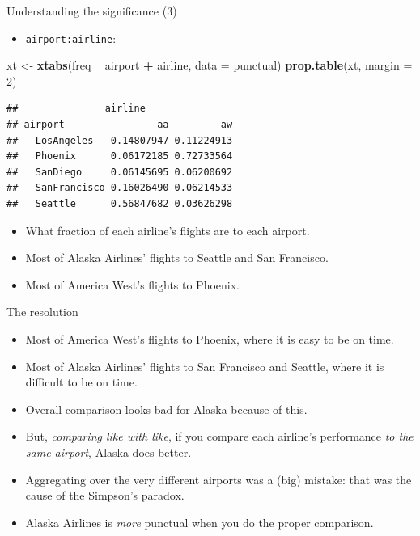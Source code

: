 \documentclass[ignorenonframetext,]{beamer}
\newenvironment{Shaded}{\begin{snugshade}}{\end{snugshade}}
\newcommand{\DataTypeTok}[1]{\textcolor[rgb]{0.13,0.29,0.53}{#1}}
\newcommand{\DecValTok}[1]{\textcolor[rgb]{0.00,0.00,0.81}{#1}}
\newcommand{\KeywordTok}[1]{\textcolor[rgb]{0.13,0.29,0.53}{\textbf{#1}}}
\newcommand{\NormalTok}[1]{#1}
\newcommand{\OperatorTok}[1]{\textcolor[rgb]{0.81,0.36,0.00}{\textbf{#1}}}
\newcommand{\StringTok}[1]{\textcolor[rgb]{0.31,0.60,0.02}{#1}}
\providecommand{\tightlist}{%
  \setlength{\itemsep}{0pt}\setlength{\parskip}{0pt}}
\begin{document}
\begin{frame}[fragile]{Understanding the significance (3)}
\protect\hypertarget{understanding-the-significance-3}{}

\begin{itemize}
\tightlist
\item
  \texttt{airport:airline}:
\end{itemize}

\begin{Shaded}
\begin{Highlighting}[]
\NormalTok{xt <-}\StringTok{ }\KeywordTok{xtabs}\NormalTok{(freq }\OperatorTok{~}\StringTok{ }\NormalTok{airport }\OperatorTok{+}\StringTok{ }\NormalTok{airline, }\DataTypeTok{data =}\NormalTok{ punctual)}
\KeywordTok{prop.table}\NormalTok{(xt, }\DataTypeTok{margin =} \DecValTok{2}\NormalTok{)}
\end{Highlighting}
\end{Shaded}

\begin{verbatim}
##               airline
## airport                aa         aw
##   LosAngeles   0.14807947 0.11224913
##   Phoenix      0.06172185 0.72733564
##   SanDiego     0.06145695 0.06200692
##   SanFrancisco 0.16026490 0.06214533
##   Seattle      0.56847682 0.03626298
\end{verbatim}

\begin{itemize}
\item
  What fraction of each airline's flights are to each airport.
\item
  Most of Alaska Airlines' flights to Seattle and San Francisco.
\item
  Most of America West's flights to Phoenix.
\end{itemize}

\end{frame}

\begin{frame}{The resolution}
\protect\hypertarget{the-resolution}{}

\begin{itemize}
\item
  Most of America West's flights to Phoenix, where it is easy to be on
  time.
\item
  Most of Alaska Airlines' flights to San Francisco and Seattle, where
  it is difficult to be on time.
\item
  Overall comparison looks bad for Alaska because of this.
\item
  But, \emph{comparing like with like}, if you compare each airline's
  performance \emph{to the same airport}, Alaska does better.
\item
  Aggregating over the very different airports was a (big) mistake: that
  was the cause of the Simpson's paradox.
\item
  Alaska Airlines is \emph{more} punctual when you do the proper
  comparison.
\end{itemize}

\end{frame}
\end{document}
